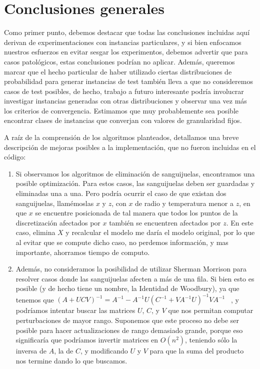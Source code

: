 \section{Conclusiones generales}

Como primer punto, debemos destacar que todas las conclusiones incluidas aquí derivan de experimentaciones con instancias particulares, y si bien enfocamos nuestros esfuerzos en evitar sesgar los experimentos, debemos advertir que para casos patológicos, estas conclusiones podrían no aplicar. Además, queremos marcar que el hecho particular de haber utilizado ciertas distribuciones de probabilidad para generar instancias de test también lleva a que no consideremos casos de test posibles, de hecho, trabajo a futuro interesante podría involucrar investigar instancias generadas con otras distribuciones y observar una vez más los criterios de convergencia. Estimamos que muy probablemente sea posible encontrar clases de instancias que converjan con valores de granularidad fijos.

A raíz de la comprensión de los algoritmos planteados, detallamos una breve descripción de mejoras posibles a la implementación, que no fueron incluidas en el código:

\begin{enumerate}
\item Si observamos los algoritmos de eliminación de sanguijuelas, encontramos una posible optimización. Para estos casos, las sanguijuelas deben ser guardadas y eliminadas una a una. Pero podría ocurrir el caso de que existan dos sanguijuelas, llamémoslas $x$ y $z$, con $x$ de radio y temperatura menor a $z$, en que $x$ se encuentre posicionada de tal manera que todos los puntos de la discretizaci\'on afectados por $x$ también se encuentren afectados por $z$. En este caso, elimina $X$ y recalcular el modelo me daría el modelo original, por lo que al evitar que se compute dicho caso, no perdemos información, y mas importante, ahorramos tiempo de computo.

\item Además, no consideramos la posibilidad de utilizar Sherman Morrison para resolver casos donde las sanguijuelas afecten a más de una fila. Si bien esto es posible (y de hecho tiene un nombre, la Identidad de Woodbury), ya que tenemos que $(A + UCV)^{-1} = A^{-1} - A^{-1} U (C^{-1} + V A^{-1} U)^{-1} V A^{-1}$ ~\cite[p.~330]{woodbury}, y podríamos intentar buscar las matrices $U$, $C$, y $V$ que nos permitan computar perturbaciones de mayor rango. Suponemos que este proceso no debe ser posible para hacer actualizaciones de rango demasiado grande, porque eso significaría que podríamos invertir matrices en $O(n^2)$, teniendo sólo la inversa de $A$, la de $C$, y modificando $U$ y $V$ para que la suma del producto nos termine dando lo que buscamos.
\end{enumerate}

